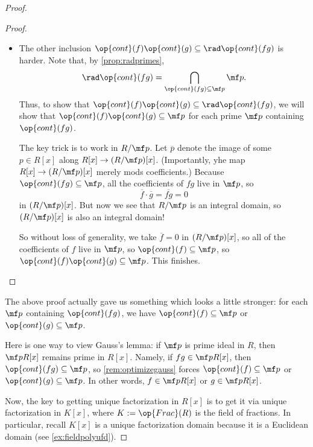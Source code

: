 \begin{proof}
\begin{proof}
\begin{itemize}
			\item The other inclusion $\op{cont}(f)\op{cont}(g)\subseteq\rad\op{cont}(fg)$ is harder. Note that, by \autoref{prop:radprimes},
			\[\rad\op{cont}(fg)=\bigcap_{\op{cont}(fg)\subseteq\mf p}\mf p.\]
			Thus, to show that $\op{cont}(f)\op{cont}(g)\subseteq\rad\op{cont}(fg)$, we will show that $\op{cont}(f)\op{cont}(g)\subseteq\mf p$ for each prime $\mf p$ containing $\op{cont}(fg)$.

			The key trick is to work in $R/\mf p$. Let $\overline p$ denote the image of some $p\in R[x]$ along $R[x]\to(R/\mf p)[x]$. (Importantly, yhe map $R[x]\to(R/\mf p)[x]$ merely mods coefficients.) Because $\op{cont}(fg)\subseteq\mf p$, all the coefficients of $fg$ live in $\mf p$, so
			\[\overline f\cdot\overline g=\overline{fg}=0\]
			in $(R/\mf p)[x]$. But now we see that $R/\mf p$ is an integral domain, so $(R/\mf p)[x]$ is also an integral domain!
			
			So without loss of generality, we take $\overline f=0$ in $(R/\mf p)[x]$, so all of the coefficients of $f$ live in $\mf p$, so $\op{cont}(f)\subseteq\mf p$, so $\op{cont}(f)\op{cont}(g)\subseteq\mf p$. This finishes.
			\qedhere
		\end{itemize}
	\end{proof}
	\begin{remark}[Nir] \label{rem:optimizegauss}
		The above proof actually gave us something which looks a little stronger: for each $\mf p$ containing $\op{cont}(fg)$, we have $\op{cont}(f)\subseteq\mf p$ or $\op{cont}(g)\subseteq\mf p$.
	\end{remark}
	\begin{remark}[Nir] \label{rem:primeslift}
		Here is one way to view Gauss's lemma: if $\mf p$ is prime ideal in $R$, then $\mf pR[x]$ remains prime in $R[x]$. Namely, if $fg\in\mf pR[x]$, then $\op{cont}(fg)\subseteq\mf p$, so \autoref{rem:optimizegauss} forces $\op{cont}(f)\subseteq\mf p$ or $\op{cont}(g)\subseteq\mf p$. In other words, $f\in\mf pR[x]$ or $g\in\mf pR[x]$.
	\end{remark}
	Now, the key to getting unique factorization in $R[x]$ is to get it via unique factorization in $K[x]$, where $K:=\op{Frac}(R)$ is the field of fractions. In particular, recall $K[x]$ is a unique factorization domain because it is a Euclidean domain (see \autoref{ex:fieldpolyufd}).


\end{proof}
